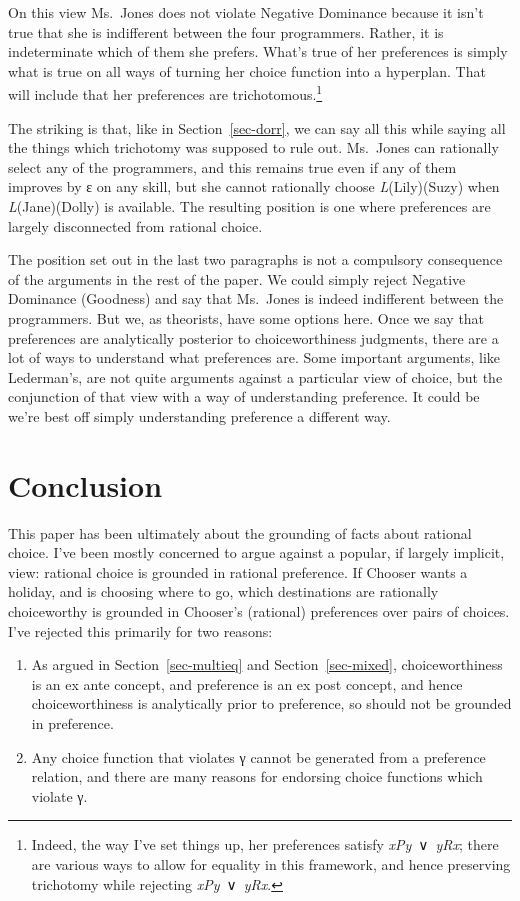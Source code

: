 \documentclass[
  11pt,
  letterpaper,
  DIV=11,
  numbers=noendperiod,
  twoside]{scrartcl}
\providecommand{\tightlist}{%
  \setlength{\itemsep}{0pt}\setlength{\parskip}{0pt}}
\begin{document}
On this view Ms.~Jones does not violate Negative Dominance because it
isn't true that she is indifferent between the four programmers. Rather,
it is indeterminate which of them she prefers. What's true of her
preferences is simply what is true on all ways of turning her choice
function into a hyperplan. That will include that her preferences are
trichotomous.\footnote{Indeed, the way I've set things up, her
  preferences satisfy \emph{xPy}~∨~\emph{yRx}; there are various ways to
  allow for equality in this framework, and hence preserving trichotomy
  while rejecting \emph{xPy}~∨~\emph{yRx}.}

The striking is that, like in Section~\ref{sec-dorr}, we can say all
this while saying all the things which trichotomy was supposed to rule
out. Ms.~Jones can rationally select any of the programmers, and this
remains true even if any of them improves by ε on any skill, but she
cannot rationally choose \emph{L}(Lily)(Suzy) when \emph{L}(Jane)(Dolly)
is available. The resulting position is one where preferences are
largely disconnected from rational choice.

The position set out in the last two paragraphs is not a compulsory
consequence of the arguments in the rest of the paper. We could simply
reject Negative Dominance (Goodness) and say that Ms.~Jones is indeed
indifferent between the programmers. But we, as theorists, have some
options here. Once we say that preferences are analytically posterior to
choiceworthiness judgments, there are a lot of ways to understand what
preferences are. Some important arguments, like Lederman's, are not
quite arguments against a particular view of choice, but the conjunction
of that view with a way of understanding preference. It could be we're
best off simply understanding preference a different way.

\section{Conclusion}\label{sec-conclusion}

This paper has been ultimately about the grounding of facts about
rational choice. I've been mostly concerned to argue against a popular,
if largely implicit, view: rational choice is grounded in rational
preference. If Chooser wants a holiday, and is choosing where to go,
which destinations are rationally choiceworthy is grounded in Chooser's
(rational) preferences over pairs of choices. I've rejected this
primarily for two reasons:

\begin{enumerate}
\def\labelenumi{\arabic{enumi}.}
\tightlist
\item
  As argued in Section~\ref{sec-multieq} and Section~\ref{sec-mixed},
  choiceworthiness is an ex ante concept, and preference is an ex post
  concept, and hence choiceworthiness is analytically prior to
  preference, so should not be grounded in preference.
\item
  Any choice function that violates γ cannot be generated from a
  preference relation, and there are many reasons for endorsing choice
  functions which violate γ.
\end{enumerate}
\end{document}
